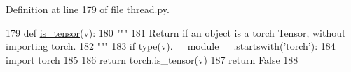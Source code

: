 Definition at line 179 of file thread.\+py.


\begin{DoxyCode}
179 \textcolor{keyword}{def }\hyperlink{namespaceparlai_1_1utils_1_1thread_ad2b01da95ecdc33d8dce76a79f48137f}{is\_tensor}(v):
180     \textcolor{stringliteral}{"""}
181 \textcolor{stringliteral}{    Return if an object is a torch Tensor, without importing torch.}
182 \textcolor{stringliteral}{    """}
183     \textcolor{keywordflow}{if} \hyperlink{namespaceparlai_1_1agents_1_1tfidf__retriever_1_1build__tfidf_ad5dfae268e23f506da084a9efb72f619}{type}(v).\_\_module\_\_.startswith(\textcolor{stringliteral}{'torch'}):
184         \textcolor{keyword}{import} torch
185 
186         \textcolor{keywordflow}{return} torch.is\_tensor(v)
187     \textcolor{keywordflow}{return} \textcolor{keyword}{False}
188 \end{DoxyCode}
